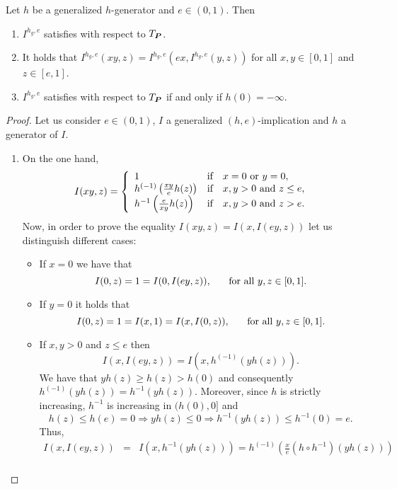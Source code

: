 \begin{proposition} Let $h$ be a generalized $h$-generator and $e \in (0,1)$. Then
	
	\begin{enumerate}[label=(\roman*)]
		\item $I^{h_g,e}$ satisfies \LIey with respect to $T_{\bm{P}}$.
		\item It holds that $I^{h_g,e}(xy,z)=I^{h_g,e}(ex,I^{h_g,e}(y,z))$ for all $x,y \in [0,1]$ and $z \in [e,1]$.
		\item $I^{h_g,e}$ satisfies \LIex with respect to $T_{\bm{P}}$ if and only if $h(0)=-\infty$.
	\end{enumerate}
	\label{propietats2(h,e)}
\end{proposition}
\begin{proof} Let us consider $e\in (0,1)$, $I$ a generalized $(h,e)$-implication and $h$ a generator of $I$.
	\begin{enumerate}[label=(\roman*)] 
		\item On the one hand,
		$$I(xy,z)= \left\{ \begin{array}{lcl}
			1 &   \hbox{if}  & x=0 \hbox{ or } y=0, \\
			h^{(-1)}\left( \frac{xy}{e}h(z) \right) &   \hbox{if}  & x,y>0 \hbox{ and } z \leq e, \\
			h^{-1}\left( \frac{e}{xy}h(z) \right) &   \hbox{if}  & x,y>0 \hbox{ and } z > e. \\
		\end{array}
		\right.
		$$
		Now, in order to prove the equality $I(xy,z)=I(x,I(ey,z))$ let us distinguish different cases:
		\begin{itemize}
			\item If $x=0$ we have that
			$$I(0,z)=1=I(0,I(ey,z)), \hspace{0.5cm} \text{ for all } y,z \in [0,1].$$
			\item If $y=0$ it holds that
			$$I(0,z)=1=I(x,1)=I(x,I(0,z)), \hspace{0.5cm} \text{ for all } y,z \in [0,1].$$
			\item If $x,y>0$ and $z \leq e$ then
			$$I(x,I(ey,z))=I(x,h^{(-1)}(yh(z))).$$
			We have that $yh(z) \geq h(z) > h(0)$ and consequently $h^{(-1)}(yh(z))=h^{-1}(yh(z))$. Moreover, since $h$ is strictly increasing, $h^{-1}$ is increasing in $(h(0),0]$ and 
			$$h(z) \leq h(e)=0 \Rightarrow yh(z) \leq 0 \Rightarrow h^{-1}(yh(z)) \leq h^{-1}(0)=e.$$
			Thus,
			\begin{eqnarray*}
			I(x,I(ey,z)) &=& I(x,h^{-1}(yh(z))) = h^{(-1)} \left( \frac{x}{e}(h \circ h^{-1})(yh(z))\right) \\

\end{eqnarray*}
\end{itemize}
\end{enumerate}
\end{proof}
